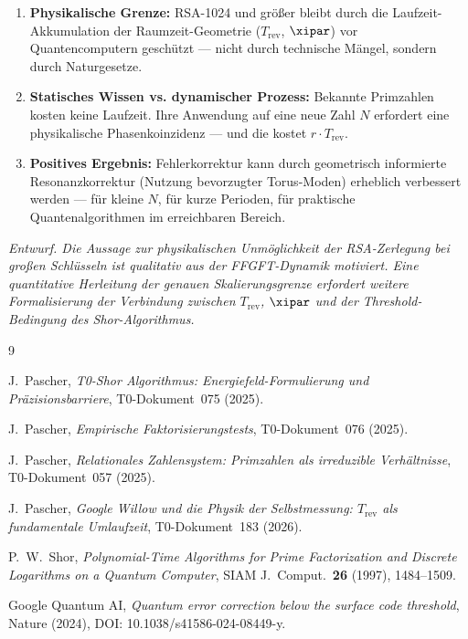 \begin{foundation}
\begin{enumerate}
    \item \textbf{Physikalische Grenze:} RSA-1024 und größer bleibt durch
    die Laufzeit-Akkumulation der Raumzeit-Geometrie ($T_\text{rev}$, $\xipar$)
    vor Quantencomputern geschützt — nicht durch technische Mängel, sondern
    durch Naturgesetze.

    \item \textbf{Statisches Wissen vs. dynamischer Prozess:} Bekannte Primzahlen
    kosten keine Laufzeit. Ihre Anwendung auf eine neue Zahl $N$ erfordert
    eine physikalische Phasenkoinzidenz — und die kostet $r \cdot T_\text{rev}$.

    \item \textbf{Positives Ergebnis:} Fehlerkorrektur kann durch geometrisch
    informierte Resonanzkorrektur (Nutzung bevorzugter Torus-Moden) erheblich
    verbessert werden — für kleine $N$, für kurze Perioden, für praktische
    Quantenalgorithmen im erreichbaren Bereich.
\end{enumerate}
\end{foundation}

\vspace{0.8cm}
\noindent
\textit{Entwurf. Die Aussage zur physikalischen Unmöglichkeit der RSA-Zerlegung
bei großen Schlüsseln ist qualitativ aus der FFGFT-Dynamik motiviert. Eine
quantitative Herleitung der genauen Skalierungsgrenze erfordert weitere Formalisierung
der Verbindung zwischen $T_\text{rev}$, $\xipar$ und der Threshold-Bedingung des
Shor-Algorithmus.}

\begin{thebibliography}{9}

J.~Pascher, \textit{T0-Shor Algorithmus: Energiefeld-Formulierung und
Präzisionsbarriere}, T0-Dokument~075 (2025).

J.~Pascher, \textit{Empirische Faktorisierungstests}, T0-Dokument~076 (2025).

J.~Pascher, \textit{Relationales Zahlensystem: Primzahlen als irreduzible
Verhältnisse}, T0-Dokument~057 (2025).

J.~Pascher, \textit{Google Willow und die Physik der Selbstmessung: $T_\text{rev}$
als fundamentale Umlaufzeit}, T0-Dokument~183 (2026).

P.~W.~Shor, \textit{Polynomial-Time Algorithms for Prime Factorization and
Discrete Logarithms on a Quantum Computer}, SIAM J.\ Comput.\ \textbf{26}
(1997), 1484--1509.

Google Quantum AI, \textit{Quantum error correction below the surface code
threshold}, Nature (2024), DOI: 10.1038/s41586-024-08449-y.

\end{thebibliography}
